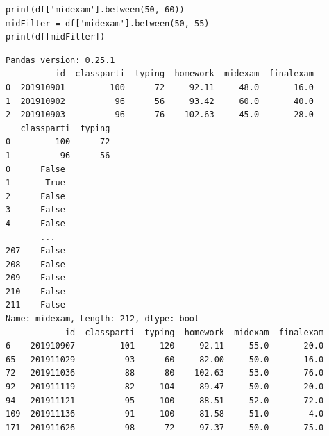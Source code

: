 \documentclass[a4paper,12pt]{article}
\begin{document}
\begin{enumerate}
\begin{enumerate}
\begin{lstlisting}
print(df['midexam'].between(50, 60))
midFilter = df['midexam'].between(50, 55)
print(df[midFilter])
\end{lstlisting}

\begin{verbatim}
Pandas version: 0.25.1
          id  classparti  typing  homework  midexam  finalexam
0  201910901         100      72     92.11     48.0       16.0
1  201910902          96      56     93.42     60.0       40.0
2  201910903          96      76    102.63     45.0       28.0
   classparti  typing
0         100      72
1          96      56
0      False
1       True
2      False
3      False
4      False
       ...  
207    False
208    False
209    False
210    False
211    False
Name: midexam, Length: 212, dtype: bool
            id  classparti  typing  homework  midexam  finalexam
6    201910907         101     120     92.11     55.0       20.0
65   201911029          93      60     82.00     50.0       16.0
72   201911036          88      80    102.63     53.0       76.0
92   201911119          82     104     89.47     50.0       20.0
94   201911121          95     100     88.51     52.0       72.0
109  201911136          91     100     81.58     51.0        4.0
171  201911626          98      72     97.37     50.0       75.0
\end{verbatim}
\end{enumerate}
\end{enumerate}
\end{document}
